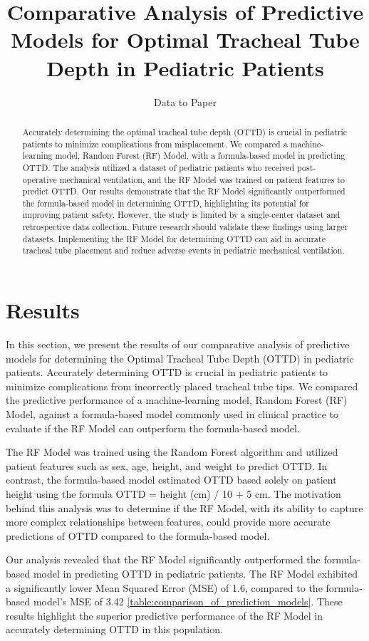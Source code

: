 \documentclass[11pt]{article}
\title{Comparative Analysis of Predictive Models for Optimal Tracheal Tube Depth in Pediatric Patients}
\author{Data to Paper}
\begin{document}
\maketitle
\begin{abstract}
Accurately determining the optimal tracheal tube depth (OTTD) is crucial in pediatric patients to minimize complications from misplacement. We compared a machine-learning model, Random Forest (RF) Model, with a formula-based model in predicting OTTD. The analysis utilized a dataset of pediatric patients who received post-operative mechanical ventilation, and the RF Model was trained on patient features to predict OTTD. Our results demonstrate that the RF Model significantly outperformed the formula-based model in determining OTTD, highlighting its potential for improving patient safety. However, the study is limited by a single-center dataset and retrospective data collection. Future research should validate these findings using larger datasets. Implementing the RF Model for determining OTTD can aid in accurate tracheal tube placement and reduce adverse events in pediatric mechanical ventilation.
\end{abstract}
\section*{Results}

In this section, we present the results of our comparative analysis of predictive models for determining the Optimal Tracheal Tube Depth (OTTD) in pediatric patients. Accurately determining OTTD is crucial in pediatric patients to minimize complications from incorrectly placed tracheal tube tips. We compared the predictive performance of a machine-learning model, Random Forest (RF) Model, against a formula-based model commonly used in clinical practice to evaluate if the RF Model can outperform the formula-based model.

The RF Model was trained using the Random Forest algorithm and utilized patient features such as sex, age, height, and weight to predict OTTD. In contrast, the formula-based model estimated OTTD based solely on patient height using the formula OTTD = height (cm) / 10 + 5 cm. The motivation behind this analysis was to determine if the RF Model, with its ability to capture more complex relationships between features, could provide more accurate predictions of OTTD compared to the formula-based model.

Our analysis revealed that the RF Model significantly outperformed the formula-based model in predicting OTTD in pediatric patients. The RF Model exhibited a significantly lower Mean Squared Error (MSE) of 1.6, compared to the formula-based model's MSE of 3.42 \ref{table:comparison_of_prediction_models}. These results highlight the superior predictive performance of the RF Model in accurately determining OTTD in this population.
\end{document}
